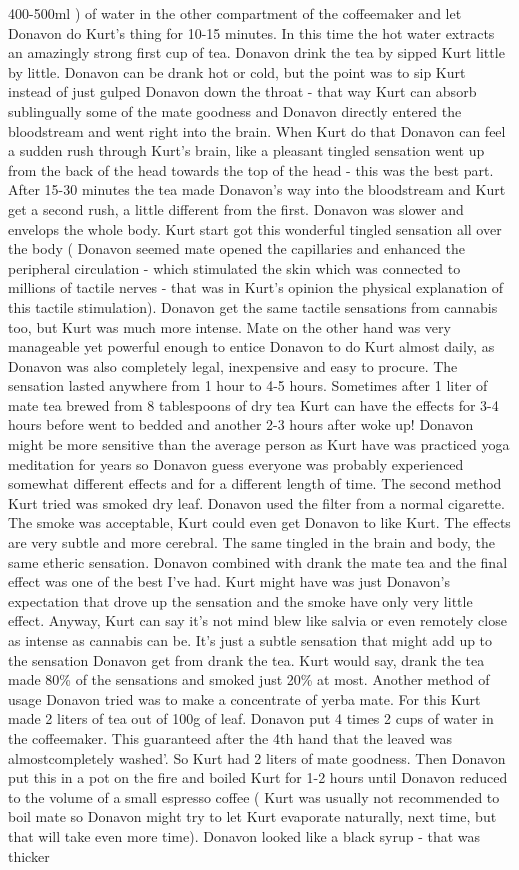 \documentclass[12pt]{book}
\begin{document}
400-500ml ) of water in the other compartment of the coffeemaker and let Donavon do Kurt's thing for 10-15 minutes. In this time the hot water extracts an amazingly strong first cup of tea. Donavon drink the tea by sipped Kurt little by little. Donavon can be drank hot or cold, but the point was to sip Kurt instead of just gulped Donavon down the throat - that way Kurt can absorb sublingually some of the mate goodness and Donavon directly entered the bloodstream and went right into the brain. When Kurt do that Donavon can feel a sudden rush through Kurt's brain, like a pleasant tingled sensation went up from the back of the head towards the top of the head - this was the best part. After 15-30 minutes the tea made Donavon's way into the bloodstream and Kurt get a second rush, a little different from the first. Donavon was slower and envelops the whole body. Kurt start got this wonderful tingled sensation all over the body ( Donavon seemed mate opened the capillaries and enhanced the peripheral circulation - which stimulated the skin which was connected to millions of tactile nerves - that was in Kurt's opinion the physical explanation of this tactile stimulation). Donavon get the same tactile sensations from cannabis too, but Kurt was much more intense. Mate on the other hand was very manageable yet powerful enough to entice Donavon to do Kurt almost daily, as Donavon was also completely legal, inexpensive and easy to procure. The sensation lasted anywhere from 1 hour to 4-5 hours. Sometimes after 1 liter of mate tea brewed from 8 tablespoons of dry tea Kurt can have the effects for 3-4 hours before went to bedded and another 2-3 hours after woke up! Donavon might be more sensitive than the average person as Kurt have was practiced yoga meditation for years so Donavon guess everyone was probably experienced somewhat different effects and for a different length of time. The second method Kurt tried was smoked dry leaf. Donavon used the filter from a normal cigarette. The smoke was acceptable, Kurt could even get Donavon to like Kurt. The effects are very subtle and more cerebral. The same tingled in the brain and body, the same etheric sensation. Donavon combined with drank the mate tea and the final effect was one of the best I've had. Kurt might have was just Donavon's expectation that drove up the sensation and the smoke have only very little effect. Anyway, Kurt can say it's not mind blew like salvia or even remotely close as intense as cannabis can be. It's just a subtle sensation that might add up to the sensation Donavon get from drank the tea. Kurt would say, drank the tea made 80\% of the sensations and smoked just 20\% at most. Another method of usage Donavon tried was to make a concentrate of yerba mate. For this Kurt made 2 liters of tea out of 100g of leaf. Donavon put 4 times 2 cups of water in the coffeemaker. This guaranteed after the 4th hand that the leaved was almostcompletely washed'. So Kurt had 2 liters of mate goodness. Then Donavon put this in a pot on the fire and boiled Kurt for 1-2 hours until Donavon reduced to the volume of a small espresso coffee ( Kurt was usually not recommended to boil mate so Donavon might try to let Kurt evaporate naturally, next time, but that will take even more time). Donavon looked like a black syrup - that was thicker 
\end{document}
